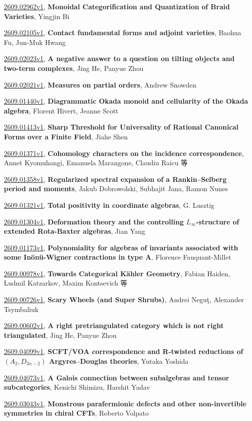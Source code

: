\documentclass[9pt, a4paper]{article}
\theoremstyle{plain}
\theoremstyle{definition}
\theoremstyle{remark}
\newcommand{\arxiv}[3]{\href{https://arxiv.org/abs/#1}{#1}, \textbf{\textcolor{arxivblue}{#2}}, #3}
\begin{document}
\arxiv{2609.02962v1}{Monoidal Categorification and Quantization of Braid Varieties}{Yingjin Bi}

\arxiv{2609.02105v1}{Contact fundamental forms and adjoint varieties}{Baohua Fu, Jun-Muk Hwang}

\arxiv{2609.02023v1}{A negative answer to a question on tilting objects and two-term complexes}{Jing He, Panyue Zhou}

\arxiv{2609.02021v1}{Measures on partial orders}{Andrew Snowden}

\arxiv{2609.01440v1}{Diagrammatic Okada monoid and cellularity of the Okada algebra}{Florent Hivert, Jeanne Scott}

\arxiv{2609.01413v1}{Sharp Threshold for Universality of Rational Canonical Forms over a Finite Field}{Jiahe Shen}

\arxiv{2609.01371v1}{Cohomology characters on the incidence correspondence}{Annet Kyomuhangi, Emanuela Marangone, Claudiu Raicu 等}

\arxiv{2609.01358v1}{Regularized spectral expansion of a Rankin--Selberg period and moments}{Jakub Dobrowolski, Subhajit Jana, Ramon Nunes}

\arxiv{2609.01321v1}{Total positivity in coordinate algebras}{G. Lusztig}

\arxiv{2609.01304v1}{Deformation theory and the controlling $L_{\infty}$-structure of extended Rota-Baxter algebras}{Jian Yang}

\arxiv{2609.01173v1}{Polynomiality for algebras of invariants associated with some Inönü-Wigner contractions in type A}{Florence Fauquant-Millet}

\arxiv{2609.00978v1}{Towards Categorical Kähler Geometry}{Fabian Haiden, Ludmil Katzarkov, Maxim Kontsevich 等}

\arxiv{2609.00726v1}{Scary Wheels (and Super Shrubs)}{Andrei Neguţ, Alexander Tsymbaliuk}

\arxiv{2609.00602v1}{A right pretriangulated category which is not right triangulated}{Jing He, Panyue Zhou}

\arxiv{2609.04099v1}{SCFT/VOA correspondence and R-twisted reductions of $(A_2,D_{3n-2})$ Argyres--Douglas theories}{Yutaka Yoshida}

\arxiv{2609.04073v1}{A Galois connection between subalgebras and tensor subcategories}{Kenichi Shimizu, Harshit Yadav}

\arxiv{2609.03043v1}{Monstrous parafermionic defects and other non-invertible symmetries in chiral CFTs}{Roberto Volpato}
\end{document}
